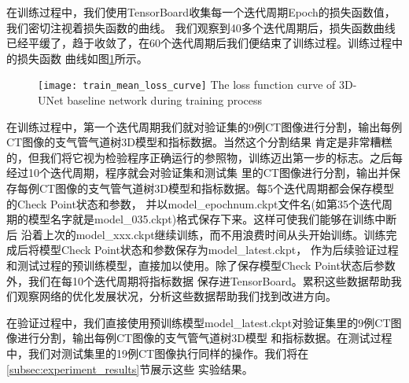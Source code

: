 在训练过程中，我们使用TensorBoard收集每一个迭代周期Epoch的损失函数值，我们密切注视着损失函数的曲线。
我们观察到40多个迭代周期后，损失函数曲线已经平缓了，趋于收敛了，在60个迭代周期后我们便结束了训练过程。训练过程中的损失函数
曲线如图\ref{fig:lossfn_curve}所示。
\begin{figure}[!htp]
    \centering
    \texttt{[image: train\_mean\_loss\_curve]}
        {The loss function curve of 3D-UNet baseline network during training process}
    \label{fig:lossfn_curve}
\end{figure}
在训练过程中，第一个迭代周期我们就对验证集的9例CT图像进行分割，输出每例CT图像的支气管气道树3D模型和指标数据。当然这个分割结果
肯定是非常糟糕的，但我们将它视为检验程序正确运行的参照物，训练迈出第一步的标志。之后每经过10个迭代周期，程序就会对验证集和测试集
里的CT图像进行分割，输出并保存每例CT图像的支气管气道树3D模型和指标数据。每5个迭代周期都会保存模型的Check Point状态和参数，
并以model\_epochnum.ckpt文件名(如第35个迭代周期的模型名字就是model\_035.ckpt)格式保存下来。这样可使我们能够在训练中断后
沿着上次的model\_xxx.ckpt继续训练，而不用浪费时间从头开始训练。训练完成后将模型Check Point状态和参数保存为model\_latest.ckpt，
作为后续验证过程和测试过程的预训练模型，直接加以使用。除了保存模型Check Point状态后参数外，我们在每10个迭代周期将指标数据
保存进TensorBoard。累积这些数据帮助我们观察网络的优化发展状况，分析这些数据帮助我们找到改进方向。

在验证过程中，我们直接使用预训练模型model\_latest.ckpt对验证集里的9例CT图像进行分割，输出每例CT图像的支气管气道树3D模型
和指标数据。在测试过程中，我们对测试集里的19例CT图像执行同样的操作。我们将在\ref{subsec:experiment_results}节展示这些
实验结果。

